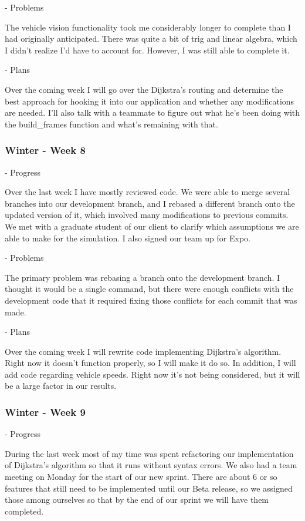 \documentclass[onecolumn, draftclsnofoot,10pt, compsoc]{IEEEtran}
\begin{document}
- Problems

The vehicle vision functionality took me considerably longer to complete than I had originally anticipated.
There was quite a bit of trig and linear algebra, which I didn't realize I'd have to account for.
However, I was still able to complete it.

- Plans

Over the coming week I will go over the Dijkstra's routing and determine the best approach for hooking it into our application and whether any modifications are needed.
I'll also talk with a teammate to figure out what he's been doing with the build\_frames function and what's remaining with that.
\subsubsection{Winter - Week 8}
- Progress

Over the last week I have mostly reviewed code.
We were able to merge several branches into our development branch, and I rebased a different branch onto the updated version of it, which involved many modifications to previous commits.
We met with a graduate student of our client to clarify which assumptions we are able to make for the simulation.
I also signed our team up for Expo.

- Problems

The primary problem was rebasing a branch onto the development branch.
I thought it would be a single command, but there were enough conflicts with the development code that it required fixing those conflicts for each commit that was made.

- Plans

Over the coming week I will rewrite code implementing Dijkstra's algorithm.
Right now it doesn't function properly, so I will make it do so.
In addition, I will add code regarding vehicle speeds.
Right now it's not being considered, but it will be a large factor in our results.
\subsubsection{Winter - Week 9}
- Progress

During the last week most of my time was spent refactoring our implementation of Dijkstra's algorithm so that it runs without syntax errors.
We also had a team meeting on Monday for the start of our new sprint.
There are about 6 or so features that still need to be implemented until our Beta release, so we assigned those among ourselves so that by the end of our sprint we will have them completed.
\end{document}
